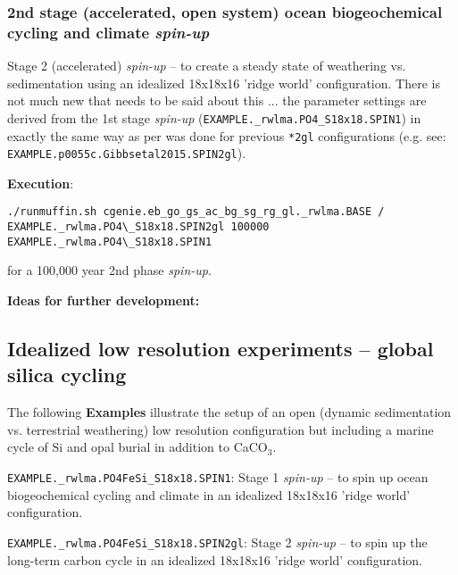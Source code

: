\documentclass[10pt,twoside]{article}
\begin{document}

\subsubsection{2nd stage (accelerated, open system) ocean biogeochemical cycling and climate \textit{spin-up}}\label{EXAMPLE.rwlma.PO4S18x18.SPIN2gl}

Stage 2 (accelerated) \textit{spin-up} -- to create a steady state of weathering vs. sedimentation using an idealized 18x18x16 'ridge world' configuration.
 There is not much new that needs to be said about this ... the parameter settings are derived from the 1st stage \textit{spin-up} (\texttt{EXAMPLE.\_rwlma.PO4\_S18x18.SPIN1}) in exactly the same way as per was done for previous \texttt{*2gl} configurations (e.g. see: \texttt{EXAMPLE.p0055c.Gibbsetal2015.SPIN2gl}).

\noindent \textbf{Execution}:
\vspace{-5pt}\begin{verbatim}./runmuffin.sh cgenie.eb_go_gs_ac_bg_sg_rg_gl._rwlma.BASE /
EXAMPLE._rwlma.PO4\_S18x18.SPIN2gl 100000 EXAMPLE._rwlma.PO4\_S18x18.SPIN1\end{verbatim}\vspace{-5pt}
for a 100,000 year 2nd phase \textit{spin-up}.

\noindent \textbf{Ideas for further development:}


\subsection{Idealized low resolution experiments -- global silica cycling}

The following \textbf{Examples} illustrate the setup of an open (dynamic sedimentation vs. terrestrial weathering) low resolution configuration but including a marine cycle of Si and opal burial in addition to CaCO\(_{3}\).

\begin{compactenum}
                        
\item \texttt{EXAMPLE.\_rwlma.PO4FeSi\_S18x18.SPIN1}: Stage 1 \textit{spin-up} -- to spin up ocean biogeochemical cycling and climate in an idealized 18x18x16 'ridge world' configuration.
                        
\item \texttt{EXAMPLE.\_rwlma.PO4FeSi\_S18x18.SPIN2gl}: Stage 2 \textit{spin-up} -- to spin up the long-term carbon cycle in an idealized 18x18x16 'ridge world' configuration.                 
                                
\end{compactenum}      
\end{document}
